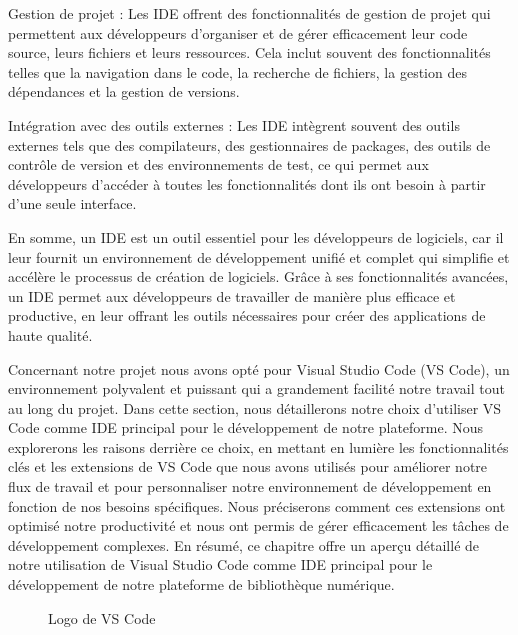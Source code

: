 	Gestion de projet : Les IDE offrent des fonctionnalités de gestion de projet qui permettent aux développeurs d'organiser et de gérer efficacement leur code source, leurs fichiers et leurs ressources. Cela inclut souvent des fonctionnalités telles que la navigation dans le code, la recherche de fichiers, la gestion des dépendances et la gestion de versions.\par

	Intégration avec des outils externes : Les IDE intègrent souvent des outils externes tels que des compilateurs, des gestionnaires de packages, des outils de contrôle de version et des environnements de test, ce qui permet aux développeurs d'accéder à toutes les fonctionnalités dont ils ont besoin à partir d'une seule interface.\par

En somme, un IDE est un outil essentiel pour les développeurs de logiciels, car il leur fournit un environnement de développement unifié et complet qui simplifie et accélère le processus de création de logiciels. Grâce à ses fonctionnalités avancées, un IDE permet aux développeurs de travailler de manière plus efficace et productive, en leur offrant les outils nécessaires pour créer des applications de haute qualité.\par

Concernant notre projet nous avons opté pour Visual Studio Code (VS Code), un environnement polyvalent et puissant qui a grandement facilité notre travail tout au long du projet.
Dans cette section, nous détaillerons notre choix d'utiliser VS Code comme IDE principal pour le développement de notre plateforme. Nous explorerons les raisons derrière ce choix, en mettant en lumière les fonctionnalités clés et les extensions de VS Code que nous avons utilisés pour améliorer notre flux de travail et pour personnaliser notre environnement de développement en fonction de nos besoins spécifiques. Nous préciserons comment ces extensions ont optimisé notre productivité et nous ont permis de gérer efficacement les tâches de développement complexes.
En résumé, ce chapitre offre un aperçu détaillé de notre utilisation de Visual Studio Code comme IDE principal pour le développement de notre plateforme de bibliothèque numérique. \par 

\begin{figure}[H]%
    \center%
    \setlength{\fboxsep}{5pt}%
    \setlength{\fboxrule}{0.5pt}%
    \caption{Logo de VS Code}%
\end{figure}

